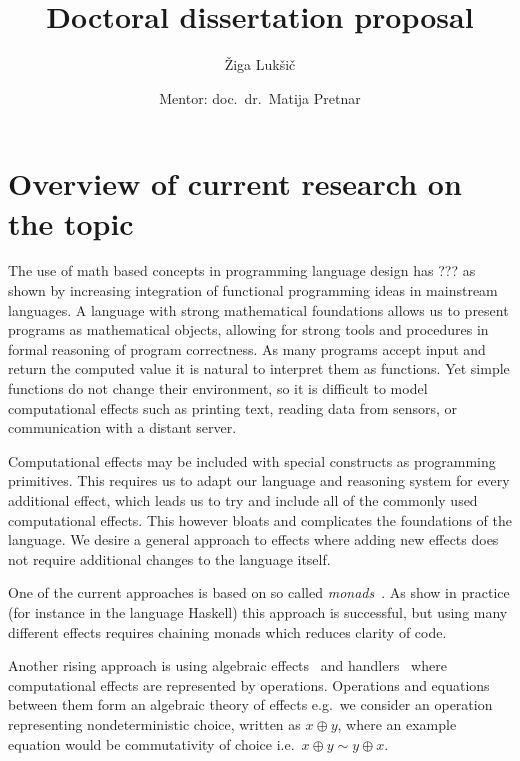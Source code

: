 \documentclass{article}
\title{Doctoral dissertation proposal}
\author{Žiga Lukšič \and Mentor: doc.\ dr.\ Matija Pretnar}
\date{}
\newcommand{\todo}[1]{{\color{red}{#1}}}
\begin{document}
\maketitle

\vspace{-10mm}
\begin{center}
  \Large{\textsc{\textbf{\todo{???}}}}

  \Large{\textsc{\textbf{\todo{??? but in english}}}}
\end{center}

\section*{Overview of current research on the topic}

The use of math based concepts in programming language design has ??? as shown by increasing integration of functional programming ideas in mainstream languages. A language with strong mathematical foundations allows us to present programs as mathematical objects, allowing for strong tools and procedures in formal reasoning of program correctness. As many programs accept input and return the computed value it is natural to interpret them as functions. Yet simple functions do not change their environment, so it is difficult to model computational effects such as printing text, reading data from sensors, or communication with a distant server.

Computational effects may be included with special constructs as programming primitives. This requires us to adapt our language and reasoning system for every additional effect, which leads us to try and include all of the commonly used computational effects. This however bloats and complicates the foundations of the language. We desire a general approach to effects where adding new effects does not require additional changes to the language itself.

One of the current approaches is based on so called \emph{monads}~\cite{DBLP:journals/iandc/Moggi91}. As show in practice (for instance in the language Haskell) this approach is successful, but using many different effects requires chaining monads which reduces clarity of code.

Another rising approach is using algebraic effects~\cite{DBLP:conf/fossacs/PlotkinP01,DBLP:journals/acs/PlotkinP03} and handlers~\cite{DBLP:conf/esop/PlotkinP09} where computational effects are represented by operations. Operations and equations between them form an algebraic theory of effects e.g.\ we consider an operation representing nondeterministic choice, written as $x \oplus y$, where an example equation would be commutativity of choice i.e.\ $x  \oplus y \sim y \oplus x$.
\end{document}
